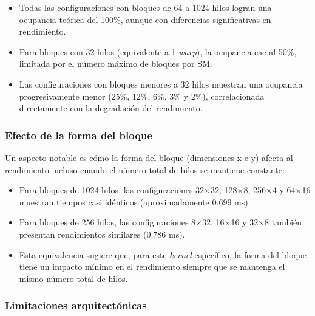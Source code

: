             \begin{itemize}
               
                \item Todas las configuraciones con bloques de 64 a 1024 hilos logran una ocupancia teórica del 100\%, aunque con diferencias significativas en rendimiento.
                
                \item Para bloques con 32 hilos (equivalente a 1 \textit{warp}), la ocupancia cae al 50\%, limitada por el número máximo de bloques por SM.
                
                \item Las configuraciones con bloques menores a 32 hilos muestran una ocupancia progresivamente menor (25\%, 12\%, 6\%, 3\% y 2\%), correlacionada directamente con la degradación del rendimiento.
           
            \end{itemize}

        \subsubsection{Efecto de la forma del bloque}

            Un aspecto notable es cómo la forma del bloque (dimensiones x e y) afecta al rendimiento incluso cuando el número total de hilos se mantiene constante:
            
            \begin{itemize}
                
                \item Para bloques de 1024 hilos, las configuraciones 32×32, 128×8, 256×4 y 64×16 muestran tiempos casi idénticos (aproximadamente 0.699 ms).
                
                \item Para bloques de 256 hilos, las configuraciones 8×32, 16×16 y 32×8 también presentan rendimientos similares (0.786 ms).
                
                \item Esta equivalencia sugiere que, para este \textit{kernel} específico, la forma del bloque tiene un impacto mínimo en el rendimiento siempre que se mantenga el mismo número total de hilos.
          
            \end{itemize}

        \subsubsection{Limitaciones arquitectónicas}
            
